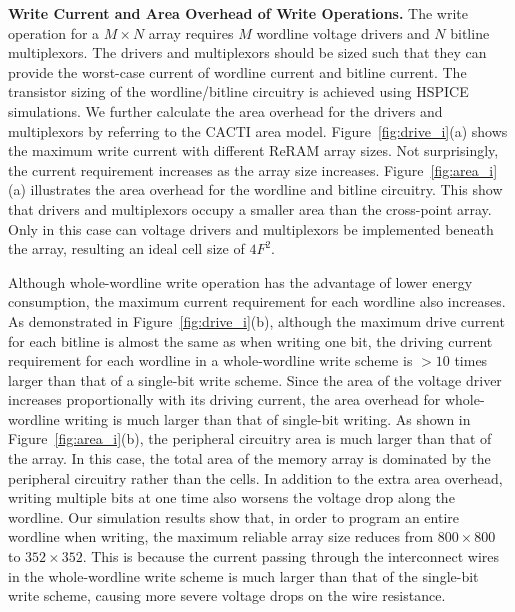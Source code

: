 \vspace{3pt}\noindent\textbf{Write Current and Area Overhead of Write
Operations.}
%
The write operation for a $M \times N$ array requires $M$ wordline voltage
drivers and $N$ bitline multiplexors. The drivers and multiplexors should
be sized such that they can provide the worst-case current of wordline
current and bitline current. The transistor sizing of the wordline/bitline
circuitry is achieved using HSPICE simulations. We further calculate the
area overhead for the drivers and multiplexors by referring to the CACTI
area model. Figure~\ref{fig:drive_i}(a) shows the maximum write current
with different ReRAM array sizes. Not surprisingly, the current
requirement increases as the array size increases.
Figure~\ref{fig:area_i}(a) illustrates the area overhead for the wordline
and bitline circuitry. This show that drivers and multiplexors occupy a
smaller area than the cross-point array. Only in this case can voltage
drivers and multiplexors be implemented beneath the array, resulting an
ideal cell size of $4F^2$.

Although whole-wordline write operation has the advantage of lower energy
consumption, the maximum current requirement for each wordline also
increases. As demonstrated in Figure~\ref{fig:drive_i}(b), although the
maximum drive current for each bitline is almost the same as when writing
one bit, the driving current requirement for each wordline in a
whole-wordline  write scheme is $>10$ times larger than that of a
single-bit write scheme. Since the area of the voltage driver increases
proportionally with its driving current, the area overhead for
whole-wordline writing is much larger than that of single-bit writing. As
shown in Figure~\ref{fig:area_i}(b), the peripheral circuitry area is much
larger than that of the array. In this case, the total area of the memory
array is dominated by the peripheral circuitry rather than the cells. In
addition to the extra area overhead, writing multiple bits at one time
also worsens the voltage drop along the wordline. Our simulation results
show that, in order to program an entire wordline when writing, the
maximum reliable array size reduces from $800 \times 800$ to $352 \times
352$. This is because the current passing through the interconnect wires
in the whole-wordline write scheme is much larger than that of the
single-bit write scheme, causing more severe voltage drops on the wire
resistance.

